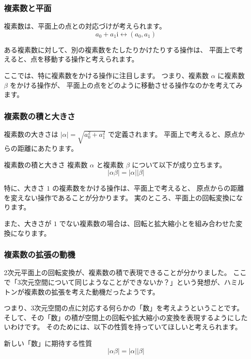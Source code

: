 \documentclass{beamer}
\newcommand{\ii}{\mathrm{i}}
\begin{document}
\begin{frame}
    \frametitle{複素数と平面}

    複素数は、平面上の点との対応づけが考えられます。
    \[
        a_0 + a_1 \ii \longleftrightarrow (a_0, a_1)
    \]

    ある複素数に対して、別の複素数をたしたりかけたりする操作は、
    平面上で考えると、点を移動する操作と考えられます。

    \bigskip

    ここでは、特に複素数をかける操作に注目します。
    つまり、複素数 \(\alpha\) に複素数 \(\beta\) をかける操作が、
    平面上の点をどのように移動させる操作なのかを考えてみます。
\end{frame}

\begin{frame}
    \frametitle{複素数の積と大きさ}

    複素数の大きさは \(|\alpha| = \sqrt{a_0^2 + a_1^2}\) で定義されます。
    平面上で考えると、原点からの距離にあたります。

    \begin{block}{複素数の積と大きさ}
        複素数 \(\alpha\) と複素数 \(\beta\) について以下が成り立ちます。
        \[
            |\alpha \beta| = |\alpha| |\beta|
        \]
    \end{block}

    特に、大きさ \(1\) の複素数をかける操作は、平面上で考えると、
    原点からの距離を変えない操作であることが分かります。
    実のところ、平面上の回転変換になります。

    また、大きさが \(1\) でない複素数の場合は、回転と拡大縮小とを組み合わせた変換になります。
\end{frame}

\begin{frame}
    \frametitle{複素数の拡張の動機}

    2次元平面上の回転変換が、複素数の積で表現できることが分かりました。
    ここで「3次元空間について同じようなことができないか？」という発想が、ハミルトンが複素数の拡張を考えた動機だったようです。

    \bigskip

    つまり、3次元空間の点に対応する何らかの「数」を考えようということです。
    そして、その「数」の積が空間上の回転や拡大縮小の変換を表現するようにしたいわけです。
    そのためには、以下の性質を持っていてほしいと考えられます。
    \begin{block}{新しい「数」に期待する性質}
        \[
            |\alpha \beta| = |\alpha| |\beta|
        \]
    \end{block}
\end{frame}
\end{document}
